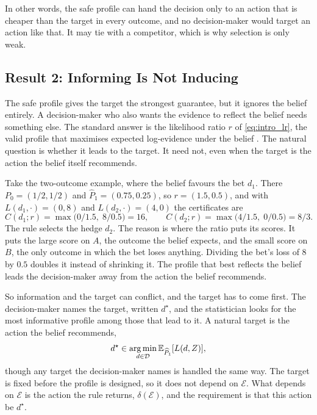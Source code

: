 In other words, the safe profile can hand the decision only to an action
that is cheaper than the target in every outcome, and no decision-maker would
target an action like that. It may tie with a competitor, which is why
selection is only weak.

\subsection{Result 2: Informing Is Not Inducing}\label{sec:result2}

The safe profile gives the target the strongest guarantee, but it ignores
the belief entirely. A decision-maker who also wants the evidence to reflect
the belief needs something else. The standard answer is the likelihood ratio
$r$ of \eqref{eq:intro_lr}, the valid profile that maximises expected
log-evidence under the belief \citep{Grunwald2024safe,Koning2025continuous}.
The natural question is whether it leads to the target. It need not, even
when the target is the action the belief itself recommends.

Take the two-outcome example, where the belief favours the bet $d_1$. There
$P_0=(1/2,1/2)$ and $\widehat P_1=(0.75,0.25)$, so $r=(1.5,0.5)$, and with
$L(d_1,\cdot)=(0,8)$ and $L(d_2,\cdot)=(4,0)$ the certificates are
\[
  C(d_1;r)=\max\bigl(0/1.5,\;8/0.5\bigr)=16,
  \qquad
  C(d_2;r)=\max\bigl(4/1.5,\;0/0.5\bigr)=8/3 .
\]
The rule selects the hedge $d_2$. The reason is where the ratio puts its
scores. It puts the large score on $A$, the outcome the belief expects, and
the small score on $B$, the only outcome in which the bet loses anything.
Dividing the bet's loss of $8$ by $0.5$ doubles it instead of shrinking it.
The profile that best reflects the belief leads the decision-maker away from
the action the belief recommends.

So information and the target can conflict, and the target has to come first.
The decision-maker names the target, written $d^\star$, and the statistician
looks for the most informative profile among those that lead to it. A natural
target is the action the belief recommends,
\[
 d^\star\in\operatorname*{arg\,min}_{d\in\mathcal D}
 \mathbb E_{\widehat P_1}[L(d,Z)],
\]
though any target the decision-maker names is handled the same way. The
target is fixed before the profile is designed, so it does not depend on
$\mathcal E$. What depends on $\mathcal E$ is the action the rule returns,
$\delta(\mathcal E)$, and the requirement is that this action be $d^\star$.

